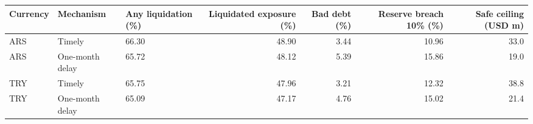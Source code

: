 \begin{tabular}{lllrrrr}
\toprule
Currency & Mechanism & Any liquidation (\%) & Liquidated exposure (\%) & Bad debt (\%) & Reserve breach 10\% (\%) & Safe ceiling (USD m) \\
\midrule
ARS & Timely & 66.30 & 48.90 & 3.44 & 10.96 & 33.0 \\
ARS & One-month delay & 65.72 & 48.12 & 5.39 & 15.86 & 19.0 \\
TRY & Timely & 65.75 & 47.96 & 3.21 & 12.32 & 38.8 \\
TRY & One-month delay & 65.09 & 47.17 & 4.76 & 15.02 & 21.4 \\
\bottomrule
\end{tabular}
